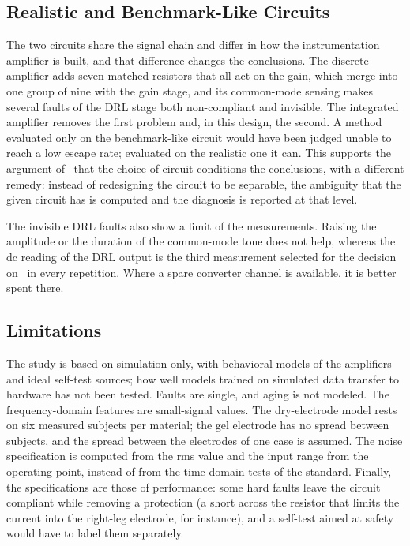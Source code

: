 \subsection{Realistic and Benchmark-Like Circuits}

The two circuits share the signal chain and differ in how the instrumentation amplifier is built,
and that difference changes the conclusions. The discrete amplifier adds seven matched resistors
that all act on the gain, which merge into one group of nine with the gain stage, and its
common-mode sensing makes several faults of the DRL stage both non-compliant and invisible. The
integrated amplifier removes the first problem and, in this design, the second. A method
evaluated only on the benchmark-like circuit would have been judged unable to reach a low escape
rate; evaluated on the realistic one it can. This supports the argument of~\cite{chen2025} that
the choice of circuit conditions the conclusions, with a different remedy: instead of redesigning
the circuit to be separable, the ambiguity that the given circuit has is computed and the
diagnosis is reported at that level.

The invisible DRL faults also show a limit of the measurements. Raising the amplitude or the
duration of the common-mode tone does not help, whereas the dc reading of the DRL output is the
third measurement selected for the decision on \cB\ in every repetition. Where a spare converter
channel is available, it is better spent there.

\subsection{Limitations}

The study is based on simulation only, with behavioral models of the amplifiers and ideal
self-test sources; how well models trained on simulated data transfer to hardware has not been
tested. Faults are single, and aging is not modeled. The frequency-domain features are
small-signal values. The dry-electrode model rests on six measured subjects per material; the
gel electrode has no spread between subjects, and the spread between the electrodes of one case
is assumed. The noise specification is computed from the rms value and the input range from the
operating point, instead of from the time-domain tests of the standard. Finally, the
specifications are those of performance: some hard faults leave the circuit compliant while
removing a protection (a short across the resistor that limits the current into the right-leg
electrode, for instance), and a self-test aimed at safety would have to label them separately.
